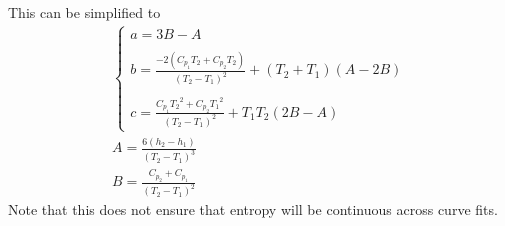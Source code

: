 This can be simplified to
\begin{gather}
  \begin{cases}
    a=3B - A \\ \\
    b=\frac{-2(C_{p_1} T_2 + C_{p_2}T_2)}{(T_2 - T_1)^2} +(T_2+T_1) (A - 2B) \\ \\
    c=\frac{C_{p_1} {T_2}^2 + C_{p_2} {T_1}^2}{(T_2-T_1)^2} + T_1 T_2 (2B - A)
  \end{cases} \\
  A = \frac{6(h_2 - h_1)}{(T_2 - T_1)^3} \\
  B = \frac{C_{p_2} + C_{p_1}}{(T_2 - T_1)^2}
\end{gather}
Note that this does not ensure that entropy will be continuous across curve
fits.


